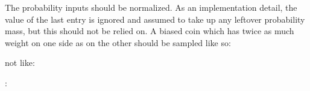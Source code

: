 \documentclass[letterpaper,10pt,english]{sphinxmanual}
\begin{document}
\begin{fulllineitems}
The probability inputs should be normalized. As an implementation
detail, the value of the last entry is ignored and assumed to take
up any leftover probability mass, but this should not be relied on.
A biased coin which has twice as much weight on one side as on the
other should be sampled like so:

\begin{sphinxVerbatim}[commandchars=\\\{\}]
 \PYG{p}{[}     \PYG{p}{]}  
\end{sphinxVerbatim}

not like:

\begin{sphinxVerbatim}[commandchars=\\\{\}]
 \PYG{p}{[} \PYG{p}{]}  
: 
\end{sphinxVerbatim}

\end{fulllineitems}

\end{document}
